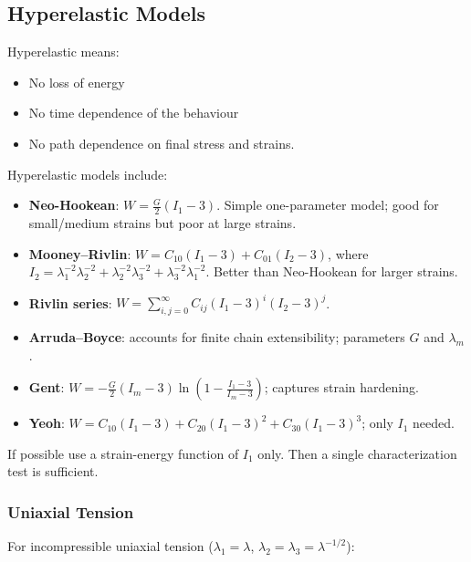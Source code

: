 \documentclass{NoteThesis/note-thesis}
\begin{document}
\subsection{Hyperelastic Models}

Hyperelastic means:

\begin{itemize}
    \item No loss of energy
    \item No time dependence of the behaviour
    \item No path dependence on final stress and strains.
\end{itemize}

Hyperelastic models include:

\begin{itemize}
    \item \textbf{Neo-Hookean}: $W = \frac{G}{2}(I_1 - 3)$. Simple one-parameter model; good for small/medium strains but poor at large strains.
    \item \textbf{Mooney--Rivlin}: $W = C_{10}(I_1 - 3) + C_{01}(I_2 - 3)$, where $I_2 = \lambda_1^{-2}\lambda_2^{-2} + \lambda_2^{-2}\lambda_3^{-2} + \lambda_3^{-2}\lambda_1^{-2}$. Better than Neo-Hookean for larger strains.
    \item \textbf{Rivlin series}: $W = \sum_{i,j=0}^{\infty} C_{ij}(I_1 - 3)^i(I_2 - 3)^j$.
    \item \textbf{Arruda--Boyce}: accounts for finite chain extensibility; parameters $G$ and $\lambda_m$.
    \item \textbf{Gent}: $W = -\frac{G}{2}(I_m - 3)\ln\left(1 - \frac{I_1 - 3}{I_m - 3}\right)$; captures strain hardening.
    \item \textbf{Yeoh}: $W = C_{10}(I_1 - 3) + C_{20}(I_1 - 3)^2 + C_{30}(I_1 - 3)^3$; only $I_1$ needed.
\end{itemize}

\begin{mynote_env}[frametitle={Model Selection}]
    If possible use a strain-energy function of $I_1$ only. Then a single characterization test is sufficient.
\end{mynote_env}

\subsubsection*{Uniaxial Tension}

For incompressible uniaxial tension ($\lambda_1 = \lambda$, $\lambda_2 = \lambda_3 = \lambda^{-1/2}$):
\end{document}
